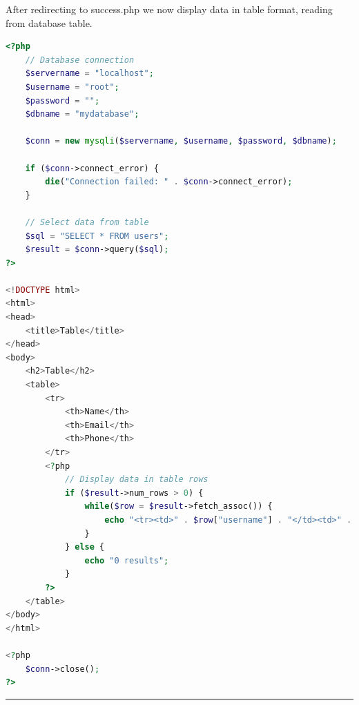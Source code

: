 \documentclass[11pt]{article}
\begin{document}
After redirecting to success.php we now display data in table format, reading from database table.
\begin{lstlisting}[language=php]
    <?php
	// Database connection
	$servername = "localhost";
	$username = "root";
	$password = "";
	$dbname = "mydatabase";

	$conn = new mysqli($servername, $username, $password, $dbname);

	if ($conn->connect_error) {
		die("Connection failed: " . $conn->connect_error);
	}

	// Select data from table
	$sql = "SELECT * FROM users";
	$result = $conn->query($sql);
?>

<!DOCTYPE html>
<html>
<head>
	<title>Table</title>
</head>
<body>
	<h2>Table</h2>
	<table>
		<tr>
			<th>Name</th>
			<th>Email</th>
			<th>Phone</th>
		</tr>
		<?php
			// Display data in table rows
			if ($result->num_rows > 0) {
				while($row = $result->fetch_assoc()) {
					echo "<tr><td>" . $row["username"] . "</td><td>" . $row["email"] . "</td><td>" . $row["phone"] . "</td></tr>";
				}
			} else {
				echo "0 results";
			}
		?>
	</table>
</body>
</html>

<?php
	$conn->close();
?>

\end{lstlisting}



\noindent\rule{\linewidth}{0.4pt}
\end{document}
